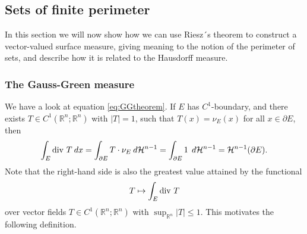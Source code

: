 \documentclass[artcle, 11pt, reqno]{amsart}
\numberwithin{equation}{section}
\newcommand{\R}{\mathbb{R}}
\newcommand{\Hd}{\mathcal{H}}
\newcommand{\dd}{\: d}
\theoremstyle{plain}
\newtheorem{theorem}{Theorem}
\theoremstyle{definition}
\theoremstyle{remark}
\begin{document}
	
	\subsection{Sets of finite perimeter}
	In this section we will now show how we can use Riesz´s theorem to construct a vector-valued surface measure, giving meaning to the notion of the perimeter of sets, and describe how it is related to the Hausdorff measure.
	
	\subsubsection{The Gauss-Green measure} \label{subsec:GGmeasure}
	We have a look at equation \eqref{eq:GGtheorem}. If $E$ has $C^1$-boundary, and there exists $T\in C^1(\R^n;\R^n)$ with $|T|=1$, such that $T(x) = \nu_E(x)$ for all $x \in \partial E$, then
	\begin{equation} \label{eq:T_C1bndry}
		\int_E \textnormal{div } T\dd x
		= \int_{\partial E} T \cdot \nu_E\dd\Hd^{n-1}
		= \int_{\partial E} 1 \: \dd\Hd^{n-1}
		= \Hd^{n-1} (\partial E).
	\end{equation}
	Note that the  right-hand side is also the greatest value attained by the functional
	\[
	T\mapsto \int_E \textnormal{div } T
	\]
	over vector fields $T\in C^1(\R^n;\R^n)$ with $\sup_{\R^n} |T| \leq 1$.
	This motivates the following definition.
	
\end{document}

